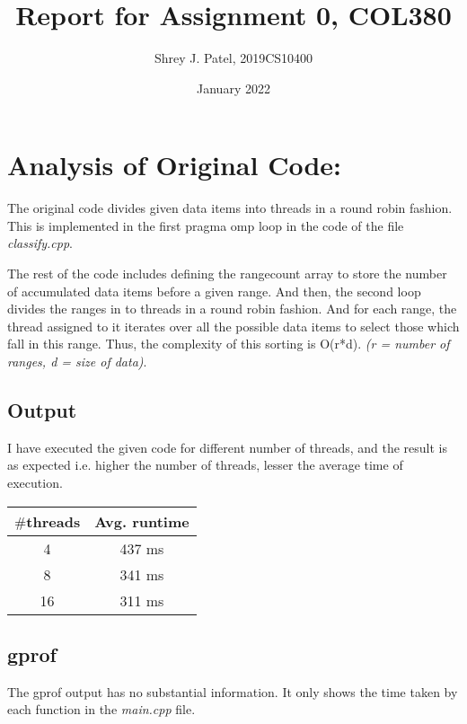 \documentclass{article}
\title{Report for Assignment 0, COL380}
\author{Shrey J. Patel, 2019CS10400}
\date{January 2022}
\begin{document}
    \maketitle 

    \tableofcontents

    \newpage

    \section{Analysis of Original Code:}
    The original code divides given data items into threads in a round robin fashion. This is implemented in the first pragma omp loop in the code of the file \textit{classify.cpp}.

    The rest of the code includes defining the rangecount array to store the number of accumulated data items before a given range. And then, the second loop divides the ranges in to threads in a round robin fashion. And for each range, the thread assigned to it iterates over all the possible data items to select those which fall in this range. Thus, the complexity of this sorting is O(r*d). \textit{(r = number of ranges, d = size of data)}.

    \subsection{Output}
    I have executed the given code for different number of threads, and the result is as expected i.e. higher the number of threads, lesser the average time of execution. 

    \begin{center}
        \begin{tabular}{|c|c|}
            \hline
            \textbf{$\#$threads} & \textbf{Avg. runtime} \\
            \hline
            4 & 437 ms \\
            \hline
            8 & 341 ms \\
            \hline
            16 & 311 ms \\
            \hline
        \end{tabular}
    \end{center}

    \subsection{gprof}
    The gprof output has no substantial information. It only shows the time taken by each function in the \textit{main.cpp} file. 
    
\end{document}
